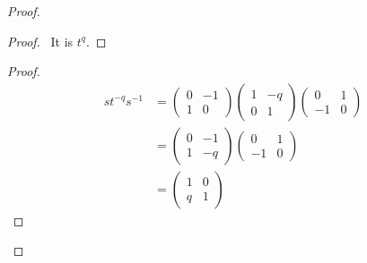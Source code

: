 \documentclass{book}
\theoremstyle{definition}
\newcommand{\inv}[1]{\ensuremath{{#1}^{-1}}}
\begin{document}
\begin{proof}
\pf
{}
\begin{proof}
	\pf\ It is $t^q$.
\end{proof}
\begin{proof}
\pf
\begin{align*}
st^{-q}\inv{s} & = \left( \begin{array}{cc}
0 & -1 \\
1 & 0
\end{array} \right)
\left( \begin{array}{cc}
1 & -q \\ 0 & 1
\end{array} \right)
\left( \begin{array}{cc}
0 & 1 \\
-1 & 0
\end{array} \right) \\
& = \left( \begin{array}{cc}
0 & -1 \\
1 & -q
\end{array} \right)
\left( \begin{array}{cc}
0 & 1 \\
-1 & 0
\end{array} \right) \\
& = \left( \begin{array}{cc}
1 & 0 \\
q & 1
\end{array} \right)
\end{align*}
\end{proof}

\end{proof}
\end{document}
